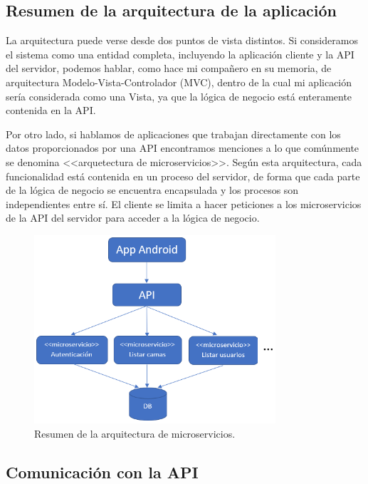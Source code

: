 \subsection{Resumen de la arquitectura de la aplicación}

La arquitectura puede verse desde dos puntos de vista distintos. Si consideramos el sistema como una entidad completa, incluyendo la aplicación cliente y la API del servidor, podemos hablar, como hace mi compañero en su memoria, de arquitectura Modelo-Vista-Controlador (MVC), dentro de la cual mi aplicación sería considerada como una Vista, ya que la lógica de negocio está enteramente contenida en la API. 

Por otro lado, si hablamos de aplicaciones que trabajan directamente con los datos proporcionados por una API encontramos menciones a lo que comúnmente se denomina <<arquetectura de microservicios>>. Según esta arquitectura, cada funcionalidad está contenida en un proceso del servidor, de forma que cada parte de la lógica de negocio se encuentra encapsulada y los procesos son independientes entre sí. El cliente se limita a hacer peticiones a los microservicios de la API del servidor para acceder a la lógica de negocio. 

\begin{figure}[H]
	\centering
	\includegraphics[width=0.8\textwidth]{../img/microservicios.png}
	\caption{Resumen de la arquitectura de microservicios.}
	\label{fig:microservicios}
\end{figure}

\subsection{Comunicación con la API}

